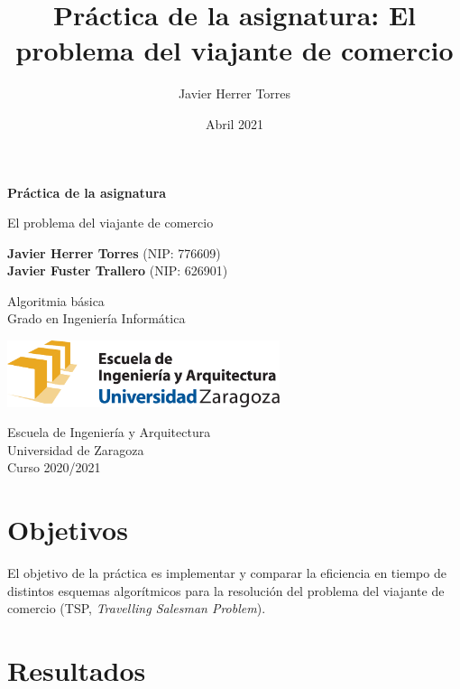 \documentclass{article}
\title{Práctica de la asignatura: El problema del viajante de comercio}
\author{Javier Herrer Torres}
\date{Abril 2021}
\begin{document}
\begin{titlepage}
    \begin{center}
        \vspace*{1cm}
            
        \Huge
        \textbf{Práctica de la asignatura}
            
        \vspace{0.5cm}
        \LARGE
        El problema del viajante de comercio
            
        \vspace{1.5cm}
            
        \textbf{Javier Herrer Torres} (NIP: 776609)\\
        \textbf{Javier Fuster Trallero} (NIP: 626901)
            
        \vfill
            
        Algoritmia básica\\
        Grado en Ingeniería Informática\\
            
        \vspace{1.5cm}
            
        \includegraphics[width=0.6\textwidth]{eina.pdf}
            
        \vspace{1.5cm}
            
        \Large
        Escuela de Ingeniería y Arquitectura\\
        Universidad de Zaragoza\\
        Curso 2020/2021
            
    \end{center}
\end{titlepage}

\section{Objetivos}
El objetivo de la práctica es implementar y comparar la eficiencia en tiempo de distintos esquemas algorítmicos para la resolución del problema del viajante de comercio (TSP, \textit{Travelling Salesman Problem}).

\section{Resultados}
\end{document}
